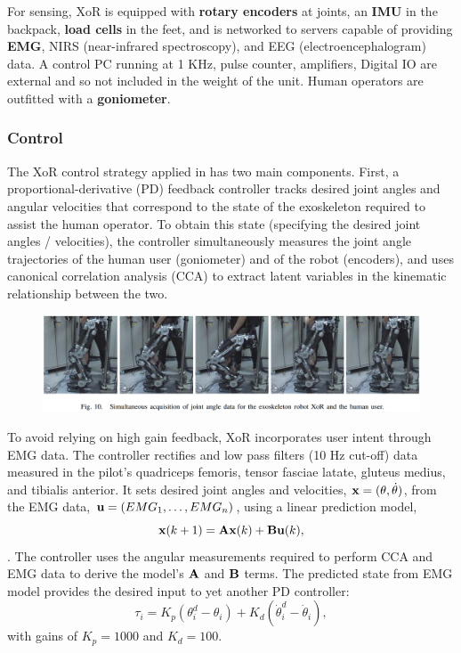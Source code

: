 \begin{refsection}
For sensing, XoR is equipped with \textbf{rotary encoders} at joints, an \textbf{IMU} in the backpack, \textbf{load cells} in the feet, and is networked to servers capable of providing \textbf{EMG}, NIRS (near-infrared spectroscopy), and EEG (electroencephalogram) data.  A control PC running at 1 KHz, pulse counter, amplifiers, Digital IO are external and so not included in the weight of the unit.  Human operators are outfitted with a \textbf{goniometer}.


\subsubsection{Control}

The XoR control strategy applied in \cite{XoRkinemExtraction2012} has two main components.  First, a proportional-derivative (PD) feedback controller tracks desired joint angles and angular velocities that correspond to the state of the exoskeleton required to assist the human operator.  To obtain this state (specifying the desired joint angles / velocities), the controller simultaneously measures the joint angle trajectories of the human user (goniometer) and of the robot (encoders), and uses canonical correlation analysis (CCA) to extract latent variables in the kinematic relationship between the two.

\begin{figure}[ht]
  \centering
  \includegraphics[width=6.0in]{exos/figs/xor_joint_angles.png}
\end{figure}

To avoid relying on high gain feedback, XoR incorporates user intent through EMG data.  The controller rectifies and low pass filters (10 Hz cut-off) data measured in the pilot's quadriceps femoris, tensor fasciae latate, gluteus medius, and tibialis anterior. 
It sets desired joint angles and velocities, ${\bf x} = ({\bf \theta}, \dot{\bf \theta})$, from the EMG data, ${\bf u} = (EMG_1, \dots , EMG_n)$, using a linear prediction model, 
\[{\bf x}(k+1) = {\bf A}{\bf x}(k)+{\bf B}{\bf u}(k),\].  
The controller uses the angular measurements required to perform CCA and EMG data to derive the model's ${\bf A}$ and ${\bf B}$ terms.  The predicted state from EMG model provides the desired input to yet another PD controller: 
\[\tau_i = K_p (\theta_i^d - \theta_i) + K_d (\dot\theta_i^d - \dot \theta_i),\] 
with gains of $K_p = 1000$ and $K_d = 100$.


\end{refsection}
